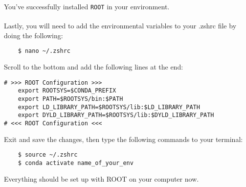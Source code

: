 \documentclass[12pt, english]{article}
\begin{document}
You've successfully installed \texttt{ROOT} in your environment. \\\\
Lastly, you will need to add the environmental variables to your .zshrc file by doing the following:
\begin{lstlisting}
    $ nano ~/.zshrc
\end{lstlisting}
Scroll to the bottom and add the following lines at the end:
\begin{lstlisting}
# >>> ROOT Configuration >>>
    export ROOTSYS=$CONDA_PREFIX
    export PATH=$ROOTSYS/bin:$PATH
    export LD_LIBRARY_PATH=$ROOTSYS/lib:$LD_LIBRARY_PATH
    export DYLD_LIBRARY_PATH=$ROOTSYS/lib:$DYLD_LIBRARY_PATH
# <<< ROOT Configuration <<<
\end{lstlisting}
Exit and save the changes, then type the following commands to your terminal:
\begin{lstlisting}
    $ source ~/.zshrc
    $ conda activate name_of_your_env
\end{lstlisting}
Everything should be set up with ROOT on your computer now. 
\end{document}
